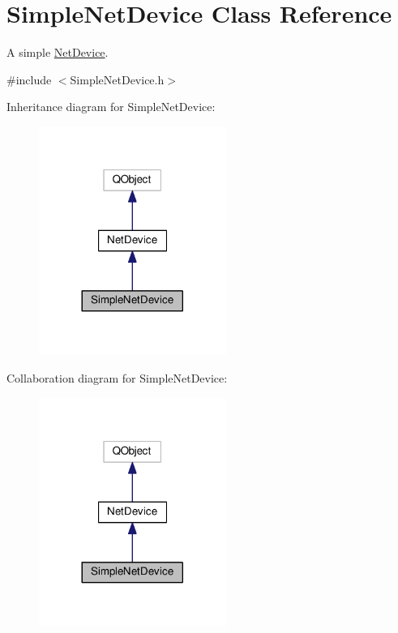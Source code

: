 \hypertarget{classSimpleNetDevice}{}\section{Simple\+Net\+Device Class Reference}
\label{classSimpleNetDevice}


A simple \hyperlink{classNetDevice}{Net\+Device}.  




{\ttfamily \#include $<$Simple\+Net\+Device.\+h$>$}



Inheritance diagram for Simple\+Net\+Device\+:\nopagebreak
\begin{figure}[H]
\begin{center}
\leavevmode
\includegraphics[width=173pt]{classSimpleNetDevice__inherit__graph}
\end{center}
\end{figure}


Collaboration diagram for Simple\+Net\+Device\+:\nopagebreak
\begin{figure}[H]
\begin{center}
\leavevmode
\includegraphics[width=173pt]{classSimpleNetDevice__coll__graph}
\end{center}
\end{figure}
